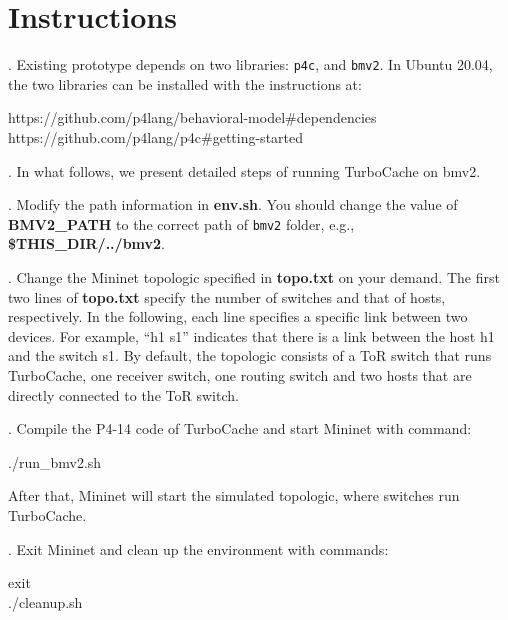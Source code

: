 \section{Instructions}

. Existing prototype depends on two libraries: \texttt{p4c}, and \texttt{bmv2}. In Ubuntu 20.04, the two libraries can be installed with the instructions at:

\begin{center}
https://github.com/p4lang/behavioral-model\#dependencies \\
https://github.com/p4lang/p4c\#getting-started \\
\end{center}

. In what follows, we present detailed steps of running TurboCache on bmv2.

. Modify the path information in \textbf{env.sh}. You should change the value of \textbf{BMV2\_PATH} to the correct path of \texttt{bmv2} folder, e.g., \textbf{\$THIS\_DIR/../bmv2}.
 
. Change the Mininet topologic specified in \textbf{topo.txt} on your demand. The first two lines of \textbf{topo.txt} specify the number of switches and that of hosts, respectively. In the following, each line specifies a specific link between two devices. For example, ``h1 s1'' indicates that there is a link between the host h1 and the switch s1. By default, the topologic consists of a ToR switch that runs TurboCache, one receiver switch, one routing switch and two hosts that are directly connected to the ToR switch.
 
. Compile the P4-14 code of TurboCache and start Mininet with command:

\begin{center}
./run\_bmv2.sh \\
\end{center}

\noindent After that, Mininet will start the simulated topologic, where switches run TurboCache. 

. Exit Mininet and clean up the environment with commands:

\begin{center}
exit \\
./cleanup.sh \\
\end{center}
